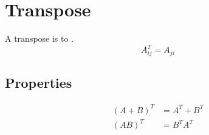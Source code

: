 \section{Transpose}

\begin{definition}
  A transpose is to .
  \begin{displaymath}
    A^{T}_{ij} = A_{ji}
  \end{displaymath}
\end{definition}

\subsection{Properties}
  
  \begin{align*}
    \left( A + B \right)^{T} &= A^{T} + B^{T} \\
    \left( AB \right)^{T} &= B^{T} A^{T}
  \end{align*}